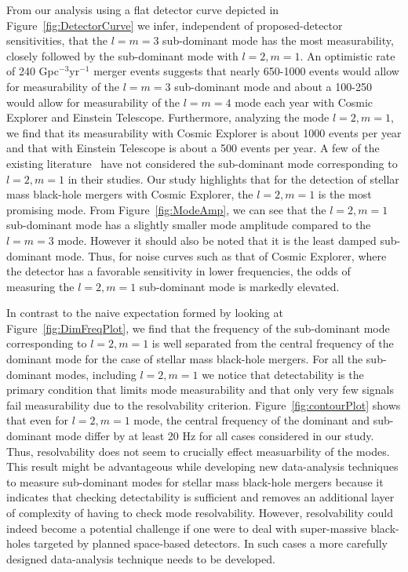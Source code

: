 From our analysis using a flat detector curve depicted in Figure~\ref{fig:DetectorCurve} we infer, independent of proposed-detector sensitivities, that the $l=m=3$ sub-dominant mode has the most measurability, closely followed by the sub-dominant mode with $l=2, m=1$. An optimistic rate of 240 Gpc$^{-3}$yr$^{-1}$ merger events suggests that nearly 650-1000 events would allow for measurability of the $l=m=3$ sub-dominant mode and about a 100-250 would allow for measurability of the $l=m=4$ mode each year with Cosmic Explorer and Einstein Telescope. Furthermore, analyzing the mode $l=2, m=1$, we find that its measurability with Cosmic Explorer is about 1000 events per year and that with Einstein Telescope is about a 500 events per year. A few of the existing literature~\cite{2004CQGra..21..787D,2016arXiv160509286B} have not considered the sub-dominant mode corresponding to $l=2, m=1$ in their studies. Our study highlights that for the detection of stellar mass black-hole mergers with Cosmic Explorer, the $l=2, m=1$ is the most promising mode. From Figure~\ref{fig:ModeAmp}, we can see that the $l=2, m=1$ sub-dominant mode has a slightly smaller mode amplitude compared to the $l=m=3$ mode. However it should also be noted that it is the least damped sub-dominant mode. Thus, for noise curves such as that of Cosmic Explorer, where the detector has a favorable sensitivity in lower frequencies, the odds of measuring the $l=2, m=1$ sub-dominant mode is markedly elevated. 

In contrast to the naive expectation formed by looking at Figure~\ref{fig:DimFreqPlot}, we find that the frequency of the sub-dominant mode corresponding to $l=2, m=1$ is well separated from the central frequency of the dominant mode for the case of stellar mass black-hole mergers. For all the sub-dominant modes, including $l=2, m=1$ we notice that detectability is the primary condition that limits mode measurability and that only very few signals fail measurability due to the resolvability criterion. Figure~\ref{fig:contourPlot} shows that even for $l=2, m=1$ mode, the central frequency of the dominant and sub-dominant mode differ by at least 20 Hz for all cases considered in our study. Thus, resolvability does not seem to crucially effect measuarbility of the modes. This result might be advantageous while developing new data-analysis techniques to measure sub-dominant modes for stellar mass black-hole mergers because it indicates that checking detectability is sufficient and removes an additional layer of complexity of having to check mode resolvability. However, resolvability could indeed become a potential challenge if one were to deal with super-massive black-holes targeted by planned space-based detectors. In such cases a more carefully designed data-analysis technique needs to be developed.


